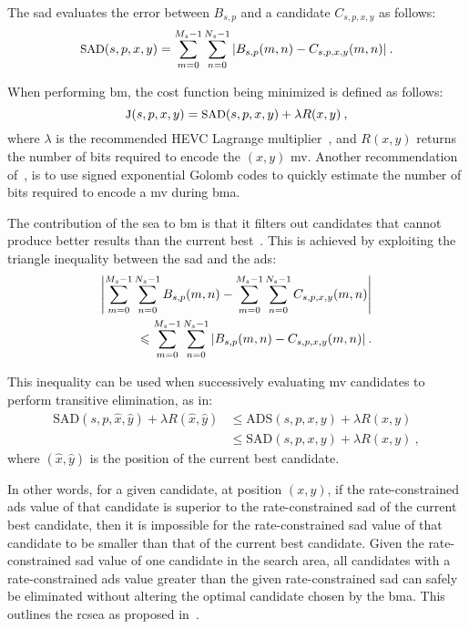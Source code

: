 \documentclass{article}
\DeclarePairedDelimiter\abs{\lvert}{\rvert}%
\newcommand{\sumsum}{
    \sum_{m = 0}^{M_s-1}\sum_{n = 0}^{N_s-1}
}
\newcommand{\sad}{
    \sumsum{\abs*{B_{s,p}(m,n) - C_{s,p,x,y}(m,n)}}
}
\newcommand{\ads}{
    \abs*{\sumsum{B_{s,p}(m,n)} - \sumsum{C_{s,p,x,y}(m,n)}}
}
\begin{document}
The \gls{sad} evaluates the error between $B_{s,p}$ and a candidate $C_{s,p,x,y}$ as follows:
\begin{equation}
\small{
\text{SAD}(s,p,x,y) = \sad\:.
}
\end{equation}

When performing \gls{bm}, the cost function being minimized is defined as follows:
\begin{equation}
\small{
\text{J}(s,p,x,y) = \text{SAD}(s,p,x,y) + \lambda R(x,y)\:,
}
\end{equation}
where $\lambda$ is the recommended HEVC Lagrange multiplier~\cite{McCann2014}, and $R(x,y)$ returns the number of bits required to encode the $(x,y)$ \gls{mv}. Another recommendation of~\cite{McCann2014}, is to use signed exponential Golomb codes to quickly estimate the number of bits required to encode a \gls{mv} during \gls{bma}.

The contribution of the \gls{sea} to \gls{bm} is that it filters out candidates that cannot produce better results than the current best~\cite{Li1995, Coban1998}. This is achieved by exploiting the triangle inequality between the \gls{sad} and the \gls{ads}:
{\small
\begin{align}
\ads \nonumber\\
\leqslant \sumsum{\abs*{B_{s,p}(m,n) - C_{s,p,x,y}(m,n)}}\:.
\end{align}
}%

This inequality can be used when successively evaluating \gls{mv} candidates to perform transitive elimination, as in:
{\small
\begin{align}
\text{SAD}(s,p,\hat{x},\hat{y}) + \lambda R(\hat{x},\hat{y}) & \leqslant \text{ADS}(s,p,x,y) + \lambda R(x,y) \nonumber\\ & \leqslant \text{SAD}(s,p,x,y) + \lambda R(x,y)\:,
\label{eq:CandidateElimination2}
\end{align}
}%
where $(\hat{x},\hat{y})$ is the position of the current best candidate.

In other words, for a given candidate, at position $(x,y)$, if the rate-constrained \gls{ads} value of that candidate is superior to the rate-constrained \gls{sad} of the current best candidate, then it is impossible for the rate-constrained \gls{sad} value of that candidate to be smaller than that of the current best candidate. Given the rate-constrained \gls{sad} value of one candidate in the search area, all candidates with a rate-constrained \gls{ads} value greater than the given rate-constrained \gls{sad} can safely be eliminated without altering the optimal candidate chosen by the \gls{bma}. This outlines the \gls{rcsea} as proposed in~\cite{Coban1998}.
\end{document}
